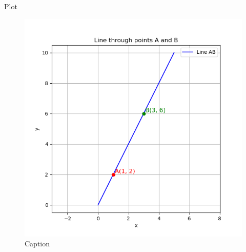 \documentclass{beamer}
\begin{document}
\begin{frame}{Plot}
    \begin{figure}
        \centering
        \includegraphics[width=0.5\linewidth]{figs/fig1.png}
        \caption{Caption}
        \label{fig:placeholder}
    \end{figure}
\end{frame}
\end{document}
